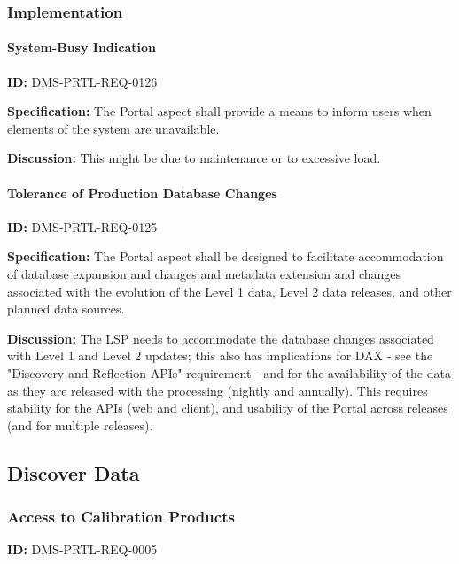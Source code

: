 \documentclass[SE,toc,lsstdraft]{lsstdoc}
\begin{document}
\subsubsection{Implementation}

\paragraph{System-Busy Indication}\hfill  %

\label{DMS-PRTL-REQ-0126}
\textbf{ID:} DMS-PRTL-REQ-0126

\textbf{Specification:}
The Portal aspect shall provide a means to inform users when elements of the system are unavailable.

\textbf{Discussion:}
This might be due to maintenance or to excessive load.

\paragraph{Tolerance of Production Database Changes}\hfill  %

\label{DMS-PRTL-REQ-0125}
\textbf{ID:} DMS-PRTL-REQ-0125

\textbf{Specification:}
The Portal aspect shall be designed to facilitate accommodation of database expansion and changes and metadata extension and changes associated with the evolution of the Level 1 data, Level 2 data releases, and other planned data sources.

\textbf{Discussion:}
The LSP needs to accommodate the database changes associated with Level 1 and Level 2 updates; this also has implications for DAX - see the "Discovery and Reflection APIs" requirement - and for the availability of the data as they are released with the processing (nightly and annually).  This requires stability for the APIs (web and client), and usability of the Portal across releases (and for multiple releases).

\subsection{Discover Data}

\subsubsection{Access to Calibration Products}

\label{DMS-PRTL-REQ-0005}
\textbf{ID:} DMS-PRTL-REQ-0005
\end{document}
